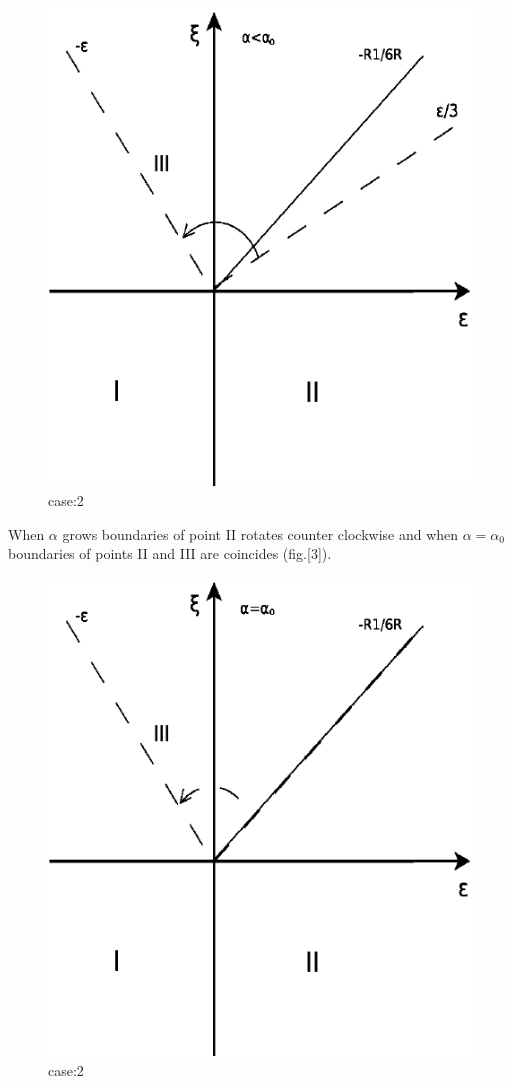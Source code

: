 \documentclass[12pt]{article}
\begin{document}
\begin{figure}
 \includegraphics{./Diagram3.pdf}
 \caption{case:2}
 \label{fig:2}
\end{figure}


 When $\alpha$ grows boundaries of point II rotates counter clockwise and when $\alpha=\alpha_0$ boundaries of points II and III are coincides (fig.[3]).

\begin{figure}
 \includegraphics{./Diagram4.pdf}
 \caption{case:2}
 \label{fig:3}
\end{figure}
\end{document}
